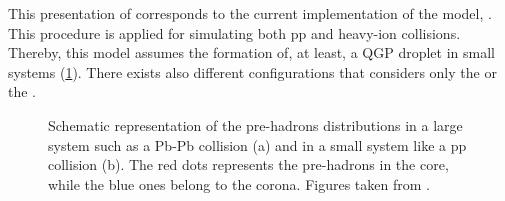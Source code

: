 This presentation of \Epos corresponds to the current implementation of the model, \EposFour. This procedure is applied for simulating both pp and heavy-ion collisions. Thereby, this model assumes the formation of, at least, a QGP droplet in small systems (\fig\ref{fig:CoreCoronaPbPbpp}). There exists also different configurations that considers only the  or the .

\begin{figure}[t]
\centering
{}
\caption{Schematic representation of the pre-hadrons distributions in a large system such as a Pb-Pb collision (a) and in a small system like a pp collision (b). The red dots represents the pre-hadrons in the core, while the blue ones belong to the corona. Figures taken from \cite{wernerCorecoronaProcedureMicrocanonical2023}.}
	\label{fig:CoreCoronaPbPbpp}
\end{figure}

